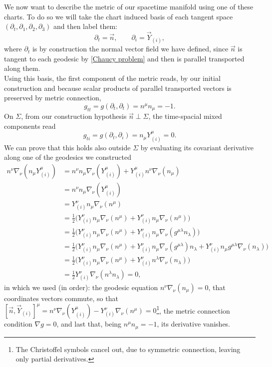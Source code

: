 We now want to describe the metric of our spacetime manifold using one of these charts. To do so we will take the chart induced basis of each tangent space $(\partial_t,\partial_1,\partial_2,\partial_3)$ and then label them:
\begin{equation*}
    \partial_t=\vec n,\qquad \partial_i= \vec Y_{(i)},
\end{equation*}
where $\partial_t$ is by construction the normal vector field we have defined, since $\vec n$ is tangent to each geodesic by \eqref{Chaucy problem} and then is parallel transported along them.\\
Using this basis, the first component of the metric reads, by our initial construction and because scalar products of parallel transported vectors is preserved by metric connection,
\begin{equation}
    g_{tt}=g(\partial_t,\partial_t)=n^\mu n_\mu=-1.\label{gen gtt}
\end{equation} 
On $\Sigma$, from our construction hypothesis $\vec{n}\perp\Sigma $, the time-spacial mixed components read 
\begin{equation}
    g_{ti}=g(\partial_t,\partial_i)=n_\mu Y^\mu_{(i)}=0.\label{gen gti}
\end{equation} 
We can prove that this holds also outside $\Sigma$ by evaluating its covariant derivative along one of the geodesics we constructed
\begin{align*}
    n^\nu\nabla_\nu(n_\mu Y_{(i)}^\mu)&=n^\nu n_\mu \nabla_\nu( Y_{(i)}^\mu)+Y_{(i)}^\mu n^\nu  \nabla_\nu(n_\mu )\\
    &=n^\nu n_\mu \nabla_\nu( Y_{(i)}^\mu)\\
    &=Y^\nu_{(i)}n_\mu\nabla_\nu(n^\mu)\\
    &=\frac{1}{2}\big(Y^\nu_{(i)}n_\mu\nabla_\nu(n^\mu)+Y^\nu_{(i)}n_\mu\nabla_\nu(n^\mu)\big)\\
    &=\frac{1}{2}\big(Y^\nu_{(i)}n_\mu\nabla_\nu(n^\mu)+Y^\nu_{(i)}n_\mu\nabla_\nu(g^{\mu\lambda}n_{\lambda})\big)\\
    &=\frac{1}{2}\big(Y^\nu_{(i)}n_\mu\nabla_\nu(n^\mu)+Y^\nu_{(i)}n_\mu\nabla_\nu(g^{\mu\lambda})n_{\lambda}+Y^\nu_{(i)}n_\mu g^{\mu\lambda}\nabla_\nu(n_{\lambda})\big)\\
    &=\frac{1}{2}\big(Y^\nu_{(i)}n_\mu\nabla_\nu(n^\mu)+Y^\nu_{(i)}n^\lambda\nabla_\nu(n_{\lambda})\big)\\
    &=\frac{1}{2}Y^\nu_{(i)}\nabla_\nu(n^\lambda n_\lambda)=0,
\end{align*}
in which we used (in order): the geodesic equation $n^\nu  \nabla_\nu(n_\mu )=0$, that coordinates vectors commute, so that $[\vec n,\vec Y_{(i)}]^\mu=n^\nu \nabla_\nu( Y_{(i)}^\mu)-Y^\nu_{(i)}\nabla_\nu(n^\mu)=0$\footnote{The Christoffel symbols cancel out, due to symmetric connection, leaving only partial derivatives.}, the metric connection condition $\nabla g=0$, and last that, being $n^\mu n_\mu=-1$, its derivative vanishes.\\
